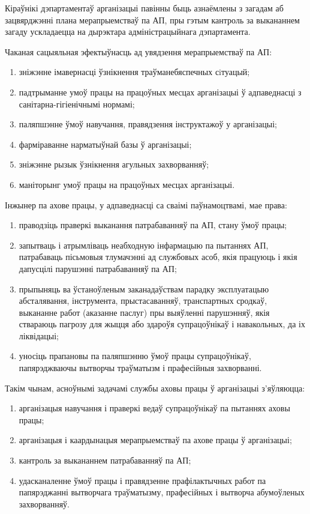 Кіраўнікі дэпартаментаў арганізацыі павінны быць азнаёмлены з загадам аб зацвярджэнні плана мерапрыемстваў па АП, пры гэтым кантроль за выкананнем загаду ускладаецца на дырэктара адміністрацыйнага дэпартамента.

Чаканая сацыяльная эфектыўнасць ад увядзення мерапрыемстваў па АП:
\begin{enumerate}
    \item зніжэнне імавернасці ўзнікнення траўманебяспечных сiтуацый;
    \item падтрыманне умоў працы на працоўных месцах арганізацыі ў адпаведнасці з санітарна-гігіенічнымі нормамі;
    \item паляпшэнне ўмоў навучання, правядзення інструктажоў у арганізацыі;
    \item фарміраванне нарматыўнай базы ў арганізацыі;
    \item зніжэнне рызык ўзнікнення агульных захворванняў;
    \item маніторынг умоў працы на працоўных месцах арганізацыі.
\end{enumerate}

Інжынер па ахове працы, у адпаведнасці са сваімі паўнамоцтвамі, мае права:
\begin{enumerate}
    \item праводзіць праверкі выканання патрабаванняў па АП, стану ўмоў працы;
    \item запытваць і атрымліваць неабходную інфармацыю па пытаннях АП, патрабаваць пісьмовыя тлумачэнні ад службовых асоб, якія працуюць і якія дапусцілі парушэнні патрабаванняў па АП;
    \item прыпыняць ва ўстаноўленым заканадаўствам парадку эксплуатацыю абсталявання, інструмента, прыстасаванняў, транспартных сродкаў, выкананне работ (аказанне паслуг) пры выяўленні парушэнняў, якія ствараюць пагрозу для жыцця або здароўя супрацоўнікаў і навакольных, да іх ліквідацыі;
    \item уносіць прапановы па паляпшэнню ўмоў працы супрацоўнікаў, папярэджваючы вытворчы траўматызм і прафесійныя захворванні.
\end{enumerate}

Такім чынам, асноўнымі задачамі службы аховы працы ў арганізацыі з'яўляюцца:
\begin{enumerate}
    \item арганізацыя навучання і праверкі ведаў супрацоўнікаў па пытаннях аховы працы;
    \item арганізацыя і каардынацыя мерапрыемстваў па ахове працы ў арганізацыі;
    \item кантроль за выкананнем патрабаванняў па АП;
    \item удасканаленне ўмоў працы і правядзенне прафілактычных работ па папярэджанні вытворчага траўматызму, прафесійных і вытворча абумоўленых захворванняў.
\end{enumerate}

